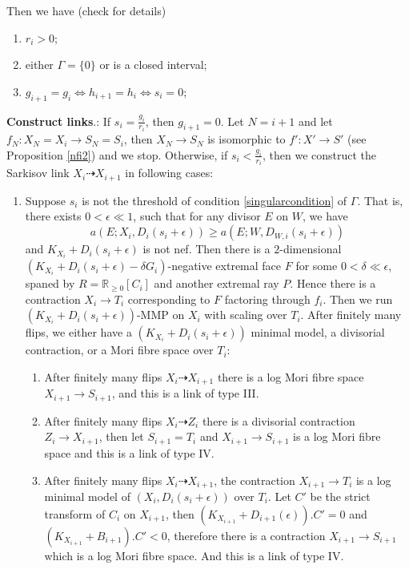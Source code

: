 \documentclass[11pt]{amsart}
\numberwithin{equation}{section}
\begin{document}
Then we have (check \cite[Lemma 4.4]{liuSarkisovProgramGeneralized2021} for details)
\begin{enumerate}
    \item $r_{i}>0$;
    \item either $\Gamma=\{0\} $ or is a closed interval;
    \item $g_{i+1}=g_{i} \Leftrightarrow h_{i+1}=h_{i} \Leftrightarrow s_{i}=0$;
\end{enumerate}
\textbf{Construct links}\label{Construction}.: If $s_{i}=\frac{g_{i}}{r_{i}}$, then $g_{i+1}=0$. Let $N=i+1$  and let $f_{N}:X_{N}=X_{i} \to S_{N}=S_{i}$, then $X_{N}\to S_{N}$ is isomorphic to $f':X'\to S'$ (see Proposition \ref{nfi2}) and  we stop. Otherwise, if  $s_{i}<\frac{g_{i}}{r_{i}}$, then we construct the Sarkisov link $X_{i}\dashrightarrow X_{i+1}$ in following cases:
\begin{enumerate}
  \item\label{2a} Suppose $s_{i}$ is not the threshold of  condition \ref{singularcondition} of $\Gamma$. That is, there exists $0<\epsilon\ll 1$, such that for any divisor $E$ on $W$, we have
    \[
      a(E;X_{i},D_{i}(s_{i}+\epsilon))\geqslant a(E;W,D_{W,i}(s_{i}+\epsilon))
    \]
    and $K_{X_{i}}+D_{i}(s_{i}+\epsilon)$ is not nef. Then there is a $2$-dimensional $(K_{X_{i}}+D_{i}(s_{i}+\epsilon)-\delta G_{i})$-negative extremal face $F$ for some $0< \delta \ll \epsilon $, spaned by $R=\mathbb{R}_{\geqslant 0}[C_{i}]$ and another extremal ray $P$. Hence there is a contraction $X_{i}\to T_{i}$ corresponding to $F$ factoring through $f_{i}$. Then we run $(K_{X_{i}}+D_{i}(s_{i}+\epsilon))$-MMP on $X_{i}$ with scaling over $T_{i}$. After finitely many flips, we either have a $(K_{X_{i}}+D_{i}(s_{i}+\epsilon))$ minimal model, a divisorial contraction, or a Mori fibre space over $T_{i}$: 
    \begin{enumerate}
    \item\label{2a1}After finitely many flips $X_{i}\dashrightarrow X_{i+1}$ there is a log Mori fibre space $X_{i+1}\to S_{i+1}$, and this is a link of type III.
    \item\label{2a2} After finitely many flips $X_{i}\dashrightarrow Z_{i}$ there is a divisorial contraction $Z_{i}\to X_{i+1}$, then let $S_{i+1}=T_{i}$ and $X_{i+1}\to S_{i+1}$ is a log Mori fibre space and this is a link of type IV.
    \item \label{2a3}After finitely many flips $X_{i}\dashrightarrow X_{i+1}$,  the contraction $X_{i+1}\to T_{i}$ is a log minimal model of $\left(X_{i},D_{i}\left(s_{i}+\epsilon\right)\right)$ over $T_{i}$. Let  $C'$ be the strict transform of  $C_{i}$ on $X_{i+1}$, then $(K_{X_{i+1}}+D_{i+1}(\epsilon)).C'=0$ and $(K_{X_{i+1}}+B_{i+1}).C'<0$, therefore there is a contraction  $X_{i+1} \to S_{i+1}$ which is a log Mori fibre space. And this is a link of type IV. 

\end{enumerate}
\end{enumerate}
\end{document}
